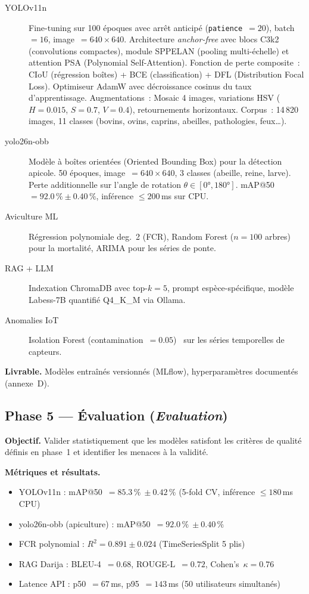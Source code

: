 \begin{description}
  \item[YOLOv11n] Fine-tuning sur 100 époques avec arrêt anticipé
        (\texttt{patience}~$= 20$), batch~$= 16$, image~$= 640\times640$.
        Architecture \textit{anchor-free} avec blocs C3k2 (convolutions compactes),
        module SPPELAN (pooling multi-échelle) et attention PSA (Polynomial
        Self-Attention). Fonction de perte composite~: CIoU (régression boîtes)
        + BCE (classification) + DFL (Distribution Focal Loss). Optimiseur
        AdamW avec décroissance cosinus du taux d'apprentissage.
        Augmentations~: Mosaic 4 images, variations HSV ($H = 0.015$, $S = 0.7$,
        $V = 0.4$), retournements horizontaux. Corpus~: 14\,820 images,
        11 classes (bovins, ovins, caprins, abeilles, pathologies, feux\ldots).
  \item[yolo26n-obb] Modèle à boîtes orientées (Oriented Bounding Box)
        pour la détection apicole. 50 époques, image~$= 640\times640$,
        3 classes (abeille, reine, larve). Perte additionnelle sur l'angle
        de rotation $\theta \in [0°, 180°]$. mAP@50~$= 92.0\,\% \pm 0.40\,\%$,
        inférence $\leq 200$\,ms sur CPU.
  \item[Aviculture ML] Régression polynomiale deg.~2 (FCR), Random Forest
        ($n = 100$ arbres) pour la mortalité, ARIMA pour les séries de ponte.
  \item[RAG + LLM] Indexation ChromaDB avec top-$k = 5$, prompt
        espèce-spécifique, modèle Labess-7B quantifié Q4\_K\_M via Ollama.
  \item[Anomalies IoT] Isolation Forest (contamination~$= 0.05$)~%
        \cite{liu2008isolation} sur les séries temporelles de capteurs.
\end{description}

\textbf{Livrable.} Modèles entraînés versionnés (MLflow),
hyperparamètres documentés (annexe~D).

\subsection*{Phase 5 --- Évaluation (\textit{Evaluation})}

\textbf{Objectif.} Valider statistiquement que les modèles satisfont les
critères de qualité définis en phase~1 et identifier les menaces à la validité.

\textbf{Métriques et résultats.}
\begin{itemize}
  \item YOLOv11n : mAP@50~$= 85.3\,\%\ \pm 0.42\,\%$ (5-fold CV,
        inférence $\leq 180$\,ms CPU)
  \item yolo26n-obb (apiculture) : mAP@50~$= 92.0\,\%\ \pm 0.40\,\%$
  \item FCR polynomial : $R^2 = 0.891 \pm 0.024$ (TimeSeriesSplit 5 plis)
  \item RAG Darija : BLEU-4~$= 0.68$, ROUGE-L~$= 0.72$,
        Cohen's~$\kappa = 0.76$~\cite{cohen1960,landis1977}
  \item Latence API : p50~$= 67$\,ms, p95~$= 143$\,ms
        (50 utilisateurs simultanés)
\end{itemize}

